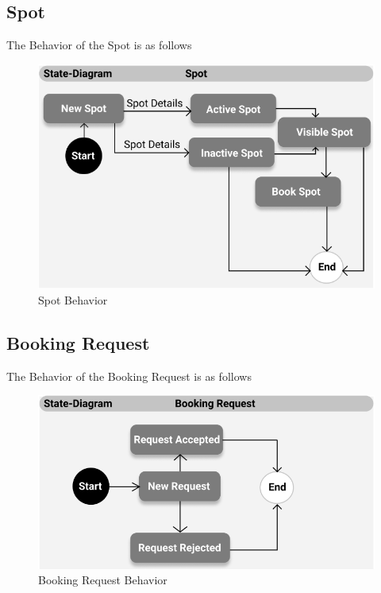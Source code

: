    \pagebreak

    \subsection{Spot}
        The Behavior of the Spot is as follows
        \begin{figure}[h]
            \centering
            \includegraphics[width=1\textwidth]{images/spotBehaviour.png}
            \caption{Spot Behavior}
            \label{fig:spotBehaviour}
        \end{figure}


    \pagebreak

    \subsection{Booking Request}
        The Behavior of the Booking Request is as follows
        \begin{figure}[h]
            \centering
            \includegraphics[width=1\textwidth]{images/bookingRequestBehaviour.png}
            \caption{Booking Request Behavior}
            \label{fig:bookingRequestBehaviour}
        \end{figure}

    \pagebreak